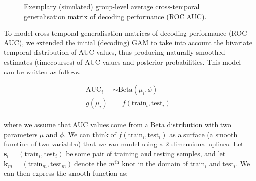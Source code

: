 \documentclass[
  doc,
  floatsintext,
  longtable,
  a4paper,
  nolmodern,
  notxfonts,
  notimes,
  colorlinks=true,linkcolor=blue,citecolor=blue,urlcolor=blue]{apa7}
\begin{document}
\begin{figure}[!htb]

\caption{\label{fig-sim-timegen}Exemplary (simulated) group-level
average cross-temporal generalisation matrix of decoding performance
(ROC AUC).}


\end{figure}%

To model cross-temporal generalisation matrices of decoding performance
(ROC AUC), we extended the initial (decoding) GAM to take into account
the bivariate temporal distribution of AUC values, thus producing
naturally smoothed estimates (timecourses) of AUC values and posterior
probabilities. This model can be written as follows:

\[
\begin{aligned}
\text{AUC}_{i} &\sim \mathrm{Beta}(\mu_{i}, \phi)\\
g(\mu_{i}) &= f \left(\text{train}_{i}, \text{test}_{i} \right)\\
\end{aligned}
\]

where we assume that AUC values come from a \(\mathrm{Beta}\)
distribution with two parameters \(\mu\) and \(\phi\). We can think of
\(f \left(\text{train}_{i}, \text{test}_{i} \right)\) as a surface (a
smooth function of two variables) that we can model using a
2-dimensional splines. Let
\(\mathbf{s}_{i} = \left(\text{train}_{i}, \text{test}_{i} \right)\) be
some pair of training and testing samples, and let
\(\mathbf{k}_{m} = \left(\text{train}_{m}, \text{test}_{m} \right)\)
denote the \(m^{\text{th}}\) knot in the domain of \(\text{train}_{i}\)
and \(\text{test}_{i}\). We can then express the smooth function as:
\end{document}
